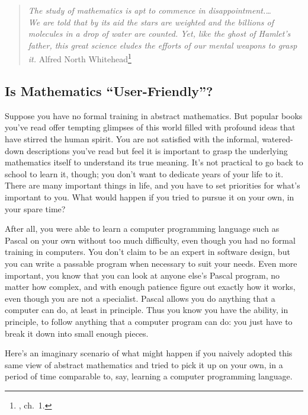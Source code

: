\begin{quote}
  {\em The study of mathematics is apt to commence in
dis\-ap\-point\-ment.\ldots \\
We are told that by its aid the stars are weighted
and the billions of molecules in a drop of water are counted.  Yet, like the
ghost of Hamlet's father, this great science eludes the efforts of our mental
weapons to grasp it.}
  \flushright\sc  Alfred North Whitehead\footnote{\cite{Whitehead}, ch.\ 1.}\\
\end{quote}

\subsection{Is Mathematics ``User-Friendly''?}

Suppose you have no formal training in abstract mathematics.  But popular
books you've read offer tempting glimpses of this world filled with profound
ideas that have stirred the human spirit.  You are not satisfied with the
informal, watered-down descriptions you've read but feel it is important to
grasp the underlying mathematics itself to understand its true meaning. It's
not practical to go back to school to learn it, though; you don't want to
dedicate years of your life to it.  There are many important things in life,
and you have to set priorities for what's important to you.  What would happen
if you tried to pursue it on your own, in your spare time?

After all, you were able to learn a computer programming language such as
Pascal on your own without too much difficulty, even though you had no formal
training in computers.  You don't claim to be an expert in software design,
but you can write a passable program when necessary to suit your needs.  Even
more important, you know that you can look at anyone else's Pascal program, no
matter how complex, and with enough patience figure out exactly how it works,
even though you are not a specialist.  Pascal allows you do anything that a
computer can do, at least in principle.  Thus you know you have the ability,
in principle, to follow anything that a computer program can do:  you just
have to break it down into small enough pieces.

Here's an imaginary scenario of what might happen if you na\-ive\-ly a\-dopted
this same view of abstract mathematics and tried to pick it up on your own, in
a period of time comparable to, say, learning a computer programming
language.

